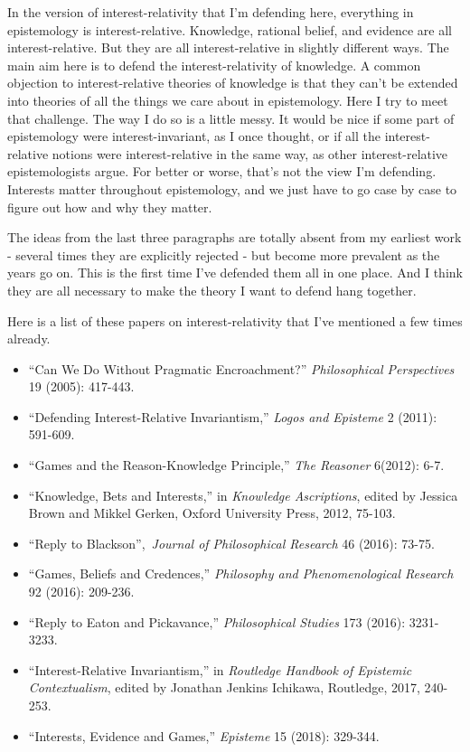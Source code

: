 \documentclass[
  10pt,
  letterpaper,
  twoside]{scrbook}
\providecommand{\tightlist}{%
  \setlength{\itemsep}{0pt}\setlength{\parskip}{0pt}}\usepackage{longtable,booktabs,array}
\begin{document}
In the version of interest-relativity that I'm defending here,
everything in epistemology is interest-relative. Knowledge, rational
belief, and evidence are all interest-relative. But they are all
interest-relative in slightly different ways. The main aim here is to
defend the interest-relativity of knowledge. A common objection to
interest-relative theories of knowledge is that they can't be extended
into theories of all the things we care about in epistemology. Here I
try to meet that challenge. The way I do so is a little messy. It would
be nice if some part of epistemology were interest-invariant, as I once
thought, or if all the interest-relative notions were interest-relative
in the same way, as other interest-relative epistemologists argue. For
better or worse, that's not the view I'm defending. Interests matter
throughout epistemology, and we just have to go case by case to figure
out how and why they matter.

The ideas from the last three paragraphs are totally absent from my
earliest work - several times they are explicitly rejected - but become
more prevalent as the years go on. This is the first time I've defended
them all in one place. And I think they are all necessary to make the
theory I want to defend hang together.

Here is a list of these papers on interest-relativity that I've
mentioned a few times already.

\begin{itemize}
\tightlist
\item
  ``Can We Do Without Pragmatic Encroachment?'' \emph{Philosophical
  Perspectives} 19 (2005): 417-443.
\item
  ``Defending Interest-Relative Invariantism,'' \emph{Logos and
  Episteme} 2 (2011): 591-609.
\item
  ``Games and the Reason-Knowledge Principle,'' \emph{The Reasoner}
  6(2012): 6-7.
\item
  ``Knowledge, Bets and Interests,'' in \emph{Knowledge Ascriptions},
  edited by Jessica Brown and Mikkel Gerken, Oxford University Press,
  2012, 75-103.
\item
  ``Reply to Blackson'',~\emph{Journal of Philosophical Research} 46
  (2016): 73-75.
\item
  ``Games, Beliefs and Credences,'' \emph{Philosophy and
  Phenomenological Research} 92 (2016): 209-236.
\item
  ``Reply to Eaton and Pickavance,'' \emph{Philosophical Studies} 173
  (2016): 3231-3233.
\item
  ``Interest-Relative Invariantism,'' in \emph{Routledge Handbook of
  Epistemic Contextualism}, edited by Jonathan Jenkins Ichikawa,
  Routledge, 2017, 240-253.
\item
  ``Interests, Evidence and Games,'' \emph{Episteme} 15 (2018): 329-344.
\end{itemize}
\end{document}
